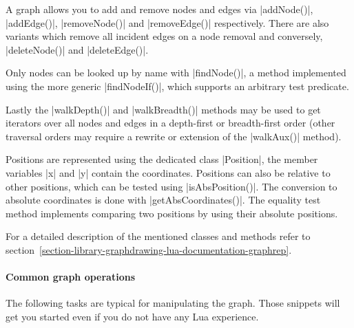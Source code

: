 A graph allows you to add and remove nodes and edges via |addNode()|,
|addEdge()|, |removeNode()| and |removeEdge()| respectively.  There are also
variants which remove all incident edges on a node removal and
conversely, |deleteNode()| and |deleteEdge()|.

Only nodes can be looked up by name with |findNode()|, a
method implemented using the more generic |findNodeIf()|, which supports
an arbitrary test predicate.

Lastly the |walkDepth()| and |walkBreadth()| methods may be used to get
iterators over all nodes and edges in a depth-first or breadth-first
order (other traversal orders may require a rewrite or extension of the
|walkAux()| method).

Positions are represented using the dedicated class |Position|, the member
variables |x| and |y| contain the coordinates.  Positions can also be
relative to other positions, which can be tested using |isAbsPosition()|.
The conversion to absolute coordinates is done with |getAbsCoordinates()|.
The equality test method implements comparing two positions by using their
absolute positions.

For a detailed description of the mentioned classes and methods refer
to section~\ref{section-library-graphdrawing-lua-documentation-graphrep}.

\paragraph{Common graph operations}
The following tasks are typical for manipulating the graph.
Those snippets will get you started even if you do not have any Lua
experience.

